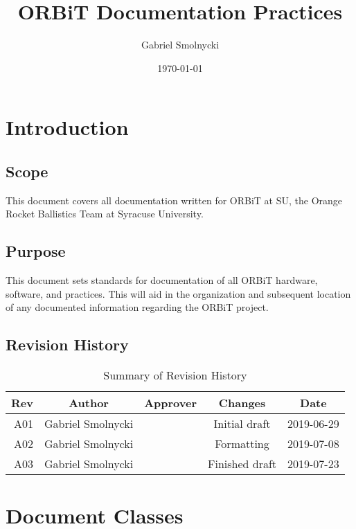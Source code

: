 \documentclass[12pt,article]{memoir}
\title{ORBiT Documentation Practices}
\author{Gabriel Smolnycki}
\date{\today}
\begin{document}


\tableofcontents*
\clearpage


\chapter{Introduction}
\section{Scope}
This document covers all documentation written for ORBiT at SU, the Orange Rocket Ballistics Team at Syracuse University.

\section{Purpose}
This document sets standards for documentation of all ORBiT hardware, software, and practices. This will aid in the organization and subsequent location of any documented information regarding the ORBiT project.

\section{Revision History}
\begin{table}[H]
	\centering
	\begin{tabu}{r || c | c | c | c }
		Rev & Author & Approver & Changes & Date\\ \hline
		A01 & Gabriel Smolnycki & & Initial draft & 2019-06-29 \\
		A02 & Gabriel Smolnycki & & Formatting & 2019-07-08 \\
		A03 & Gabriel Smolnycki & & Finished draft & 2019-07-23 
	\end{tabu}
	\caption{Summary of Revision History}
	\label{tab:rev}
\end{table}

\newpage

\chapter{Document Classes}
\end{document}
